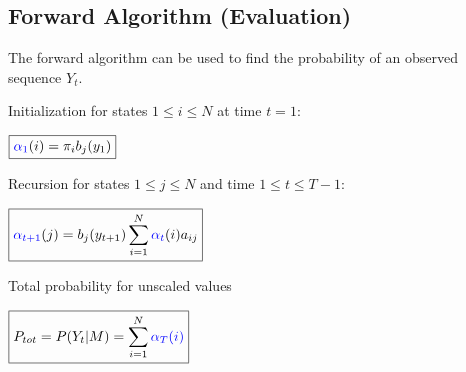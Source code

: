 \begin{minipage}[t]{0.49\textwidth}

\subsection{Forward Algorithm (Evaluation)}
The forward algorithm can be used to find the probability of an observed sequence $Y_t$.

\begin{aufzaehlung}
	\item Initialization for states $1\leq i \leq N$ at time $t=1$:\\
	
	\vspace{-0.3cm}
	
	$\boxed{\textcolor{blue}{\alpha_1}(i)=\pi_i b_j(y_1)}$ 
	
	\item Recursion for states $1\leq j \leq N$ and time $1\leq t\leq T-1$:\\
		
	\vspace{-0.3cm}
	
  $\boxed{\textcolor{blue}{\alpha_{t+1}}(j)=b_{j}(y_{t+1}) \sum\limits_{i=1}^{N}{\textcolor{blue}{\alpha_t}(i)a_{ij}}}$
	
	\item Total probability for unscaled values\\
		
	\vspace{-0.3cm}
	
	$\boxed{P_{tot} = P(Y_t|M)=\sum\limits_{i=1}^{N}{\textcolor{blue}{\alpha_T(i)}}}$
\end{aufzaehlung}
\end{minipage}
\hfill
